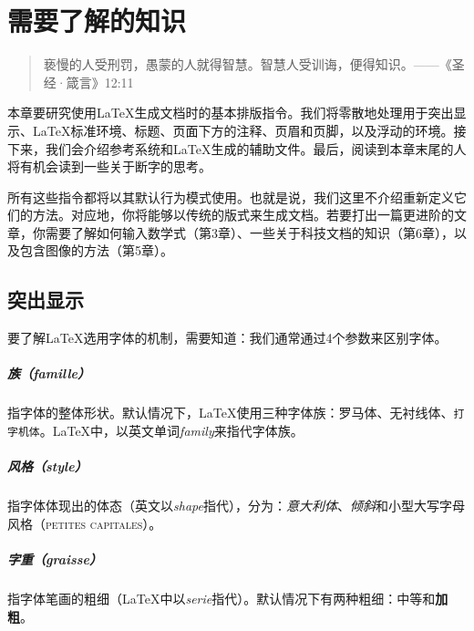 \chapter{需要了解的知识}

\begin{quote}
    亵慢的人受刑罚，愚蒙的人就得智慧。智慧人受训诲，便得知识。——《圣经·箴言》12:11
\end{quote}


本章要研究使用\LaTeX 生成文档时的基本排版指令。我们将零散地处理用于突出显示、\LaTeX 标准环境、标题、页面下方的注释、页眉和页脚，以及浮动的环境。接下来，我们会介绍参考系统和\LaTeX 生成的辅助文件。最后，阅读到本章末尾的人将有机会读到一些关于断字的思考。

所有这些指令都将以其默认行为模式使用。也就是说，我们这里不介绍重新定义它们的方法。对应地，你将能够以传统的版式来生成文档。若要打出一篇更进阶的文章，你需要了解如何输入数学式（第3章）、一些关于科技文档的知识（第6章），以及包含图像的方法（第5章）。

\section{突出显示}

要了解\LaTeX 选用字体的机制，需要知道：我们通常通过4个参数来区别字体。

\paragraph*{族（famille）}指字体的整体形状。默认情况下，\LaTeX 使用三种字体族：罗马体、\textsf{无衬线体}、\texttt{打字机体}。\LaTeX 中，以英文单词\emph{family}来指代字体族。

\paragraph*{风格（style）}指字体体现出的体态（英文以\emph{shape}指代），分为：\textit{意大利体}、\textsl{倾斜}和\textsc{小型大写字母风格（petites capitales）}。

\paragraph*{字重（graisse）}指字体笔画的粗细（\LaTeX 中以\emph{serie}指代）。默认情况下有两种粗细：中等和\textbf{加粗}。

